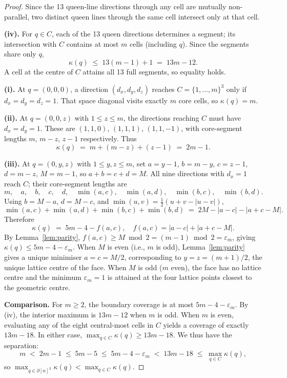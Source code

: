 \documentclass[11pt]{article}
\begin{document}
\begin{proof}
Since the 13 queen-line directions through any cell are mutually non-parallel,
two distinct queen lines through the same cell intersect only at that cell.

\smallskip\noindent\textbf{(iv).}
For $q \in C$, each of the 13 queen directions determines a segment; its
intersection with $C$ contains at most $m$ cells (including $q$). Since the
segments share only $q$,
\[
  \kappa(q) \;\leq\; 13(m-1)+1 \;=\; 13m-12.
\]
A cell at the centre of $C$ attains all 13 full segments, so equality holds.

\smallskip\noindent\textbf{(i).}
At $q = (0,0,0)$, a direction $(d_x,d_y,d_z)$ reaches $C = \{1,\ldots,m\}^3$
only if $d_x = d_y = d_z = 1$. That space diagonal visits exactly $m$ core
cells, so $\kappa(q) = m$.

\smallskip\noindent\textbf{(ii).}
At $q = (0,0,z)$ with $1 \leq z \leq m$, the directions reaching $C$ must have
$d_x = d_y = 1$. These are $(1,1,0)$, $(1,1,1)$, $(1,1,-1)$, with
core-segment lengths $m$, $m-z$, $z-1$ respectively. Thus
\[
  \kappa(q) \;=\; m + (m-z) + (z-1) \;=\; 2m-1.
\]

\smallskip\noindent\textbf{(iii).}
At $q = (0,y,z)$ with  $1 \leq y,z \leq m$, set $a = y-1$, $b = m-y$,
$c = z-1$, $d = m-z$, $M = m-1$, so $a+b = c+d = M$. All nine directions with
$d_x = 1$ reach $C$; their core-segment lengths are
\[
  m,\quad a,\quad b,\quad c,\quad d,\quad
  \min(a,c),\quad \min(a,d),\quad \min(b,c),\quad \min(b,d).
\]
Using $b = M-a$, $d = M-c$, and $\min(u,v) = \tfrac{1}{2}(u+v-|u-v|)$,
\[
  \min(a,c)+\min(a,d)+\min(b,c)+\min(b,d) \;=\; 2M - |a-c| - |a+c-M|.
\]
Therefore
\[
  \kappa(q) \;=\; 5m-4 - f(a,c), \quad f(a,c) = |a-c|+|a+c-M|.
\]
By Lemma~\ref{lem:parity}, $f(a,c) \geq M \bmod 2 = (m-1) \bmod 2 =
\varepsilon_m$, giving $\kappa(q) \leq 5m-4-\varepsilon_m$. When $M$ is even
(i.e., $m$ is odd), Lemma~\ref{lem:parity} gives a unique minimiser $a = c =
M/2$, corresponding to $y = z = (m+1)/2$, the unique lattice centre of the
face. When $M$ is odd ($m$ even), the face has no lattice centre and the
minimum $\varepsilon_m = 1$ is attained at the four lattice points closest to
the geometric centre.

\smallskip\noindent\textbf{Comparison.}
For $m \geq 2$, the boundary coverage is at most $5m - 4 - \varepsilon_m$. By (iv), the interior maximum is $13m - 12$ when $m$ is odd. When $m$ is even, evaluating any of the eight central-most cells in $C$ yields a coverage of exactly $13m - 18$. In either case, $\max_{q\in C}\kappa(q) \geq 13m - 18$. We thus have the separation:
\[
  m \;<\; 2m-1 \;\leq\; 5m-5 \;\leq\; 5m-4-\varepsilon_m \;<\; 13m-18 \;\leq\; \max_{q\in C}\kappa(q),
\]
so $\max_{q\in\partial[n]^3}\kappa(q) < \max_{q\in C}\kappa(q)$.
\end{proof}
\end{document}

